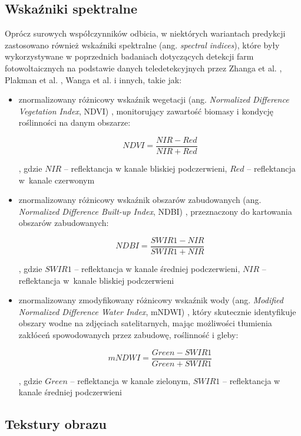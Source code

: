 \documentclass{amuthesis}
\begin{document}
\hypertarget{sec-spectral-indices}{%
\subsection{Wskaźniki spektralne}\label{sec-spectral-indices}}

Oprócz surowych współczynników odbicia, w niektórych wariantach
predykcji zastosowano również wskaźniki spektralne (ang. \emph{spectral
indices}), które były wykorzystywane w poprzednich badaniach dotyczących
detekcji farm fotowoltaicznych na podstawie danych teledetekcyjnych
przez Zhanga et al. \autocite*{zhang_2021_texture}, Plakman et al.
\autocite*{plakman_2022_pv}, Wanga et al. \autocite*{wang_2022_pv} i
innych, takie jak:

\begin{itemize}
\item
  znormalizowany różnicowy wskaźnik wegetacji (ang. \emph{Normalized
  Difference Vegetation Index}, NDVI) \autocite{ndvi}, monitorujący
  zawartość biomasy i kondycję roślinności na danym obszarze:

  \[
  NDVI = \frac{NIR - Red}{NIR + Red}
  \]

  , gdzie \(NIR\) -- reflektancja w kanale bliskiej podczerwieni,
  \(Red\) -- reflektancja w~kanale czerwonym
\item
  znormalizowany różnicowy wskaźnik obszarów zabudowanych (ang.
  \emph{Normalized Difference Built-up Index}, NDBI) \autocite{ndbi},
  przeznaczony do kartowania obszarów zabudowanych:

  \[
  NDBI = \frac{SWIR1 - NIR}{SWIR1 + NIR}
  \]

  , gdzie \(SWIR1\) -- reflektancja w kanale średniej podczerwieni,
  \(NIR\) -- reflektancja w~kanale bliskiej podczerwieni
\item
  znormalizowany zmodyfikowany różnicowy wskaźnik wody (ang.
  \emph{Modified Normalized Difference Water Index}, mNDWI)
  \autocite{mndwi}, który skutecznie identyfikuje obszary wodne na
  zdjęciach satelitarnych, mając możliwości tłumienia zakłóceń
  spowodowanych przez zabudowę, roślinność i gleby:

  \[
  mNDWI = \frac{Green - SWIR1}{Green + SWIR1}
  \]

  , gdzie \(Green\) -- reflektancja w kanale zielonym, \(SWIR1\) --
  reflektancja w kanale średniej podczerwieni
\end{itemize}

\hypertarget{sec-textures}{%
\subsection{Tekstury obrazu}\label{sec-textures}}
\end{document}
